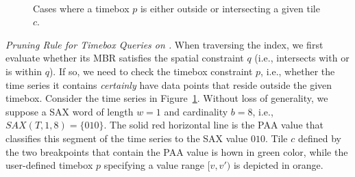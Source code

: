 \begin{figure}[!t]
 \centering
 \
\caption{Cases where a timebox $p$ is either outside or intersecting a given tile $c$.}
\label{fig:br_outside}
\end{figure}

\emph{Pruning Rule for Timebox Queries on \hisax.}
When traversing the \hisax index, we first evaluate whether its MBR satisfies the spatial constraint $q$ (i.e., intersects with or is within $q$). If so, we need to check the timebox constraint $p$, i.e., whether the time series it contains {\em certainly} have data points that reside outside the given timebox. Consider the time series in Figure~\ref{fig:br_outside}. Without loss of generality, we suppose a SAX word of length $w=1$ and cardinality $b=8$, i.e., $SAX(T,1,8)=\{010\}$. The solid red horizontal line is the PAA value that classifies this segment of the time series to the SAX value $010$. Tile $c$ defined by the two breakpoints that contain the PAA value is hown in green color, while the user-defined timebox $p$ specifying a value range $[v,v')$ is depicted in orange.

